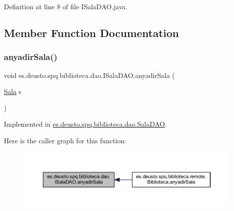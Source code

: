 Definition at line 8 of file I\+Sala\+D\+A\+O.\+java.



\subsection{Member Function Documentation}
\mbox{\label{interfacees_1_1deusto_1_1spq_1_1biblioteca_1_1dao_1_1_i_sala_d_a_o_a20257b6e5501dd812441aa6795fcd24a}} 
\subsubsection{\texorpdfstring{anyadir\+Sala()}{anyadirSala()}}
{\footnotesize\ttfamily void es.\+deusto.\+spq.\+biblioteca.\+dao.\+I\+Sala\+D\+A\+O.\+anyadir\+Sala (\begin{DoxyParamCaption}\item[{\mbox{\hyperlink{classes_1_1deusto_1_1spq_1_1biblioteca_1_1data_1_1_sala}{Sala}}}]{s }\end{DoxyParamCaption})}



Implemented in \mbox{\hyperlink{classes_1_1deusto_1_1spq_1_1biblioteca_1_1dao_1_1_sala_d_a_o_ab057300f33df6ae974e6e949900b1dc7}{es.\+deusto.\+spq.\+biblioteca.\+dao.\+Sala\+D\+AO}}.

Here is the caller graph for this function\+:
\nopagebreak
\begin{figure}[H]
\begin{center}
\leavevmode
\includegraphics[width=350pt]{interfacees_1_1deusto_1_1spq_1_1biblioteca_1_1dao_1_1_i_sala_d_a_o_a20257b6e5501dd812441aa6795fcd24a_icgraph}
\end{center}
\end{figure}
\mbox{\label{interfacees_1_1deusto_1_1spq_1_1biblioteca_1_1dao_1_1_i_sala_d_a_o_af12c5fe6a1abe11bc65e1118d991f926}} 
